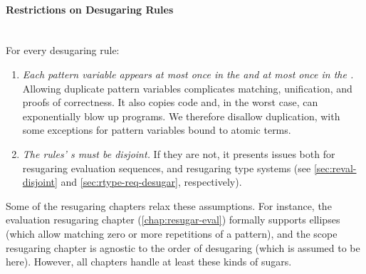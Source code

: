 \paragraph{Restrictions on Desugaring Rules}\\ \noindent
For every desugaring rule:
\begin{enumerate}
\item \emph{Each pattern variable appears at most once in the  and at
  most once in the .}
  Allowing duplicate pattern variables complicates matching, unification,
  and proofs of correctness. It also copies code
  and, in the worst case, can exponentially blow up programs.
  We therefore disallow duplication,
  with some exceptions for pattern variables bound to atomic terms.
\item \emph{The rules' s must be disjoint.} If they
  are not, it presents issues both for resugaring evaluation sequences,
  and resugaring type systems (see \cref{sec:reval-disjoint} and
  \cref{sec:rtype-req-desugar}, respectively).
\end{enumerate}

Some of the resugaring chapters relax these assumptions. For instance, the
evaluation resugaring chapter (\cref{chap:resugar-eval}) formally
supports ellipses (which allow matching zero or more repetitions of a
pattern), and the scope resugaring chapter is agnostic to the order of
desugaring (which is assumed to be  here). However, all
chapters handle at least these kinds of sugars.
